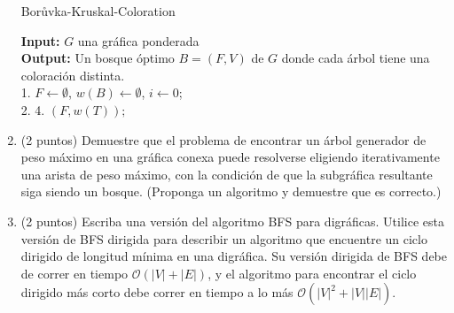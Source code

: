 \documentclass{article}
\begin{document}
\begin{enumerate}
  \begin{algorithm}[H]
    \SetAlgoNoLined
    \caption{Bor\r uvka-Kruskal-Coloration}
    \textbf{Input:} $G$ una gráfica ponderada\\
    \textbf{Output:} Un bosque óptimo $B = (F,V)$ de $G$ donde cada árbol tiene una coloración distinta.\\
    1. $F \leftarrow \emptyset$, $w(B) \leftarrow \emptyset$, $i \leftarrow 0$;\\
    2.  
    4. 
    \Return $(F,w(T));$
  \end{algorithm}
  
\item (2 puntos) Demuestre que el problema de encontrar un \'arbol generador
  de peso m\'aximo en una gr\'afica conexa puede resolverse eligiendo
  iterativamente una arista de peso m\'aximo, con la condici\'on de que la
  subgr\'afica resultante siga siendo un bosque. (Proponga un algoritmo y
  demuestre que es correcto.)

\item (2 puntos) Escriba una versi\'on del algoritmo BFS para digr\'aficas.
  Utilice esta versi\'on de BFS dirigida para describir un algoritmo que
  encuentre un ciclo dirigido de longitud m\'inima en una digr\'afica.    Su
  versi\'on dirigida de BFS debe de correr en tiempo $\mathcal{O} (|V| +
  |E|)$, y el algoritmo para encontrar el ciclo dirigido m\'as corto debe
  correr en tiempo a lo m\'as $\mathcal{O} (|V|^2 + |V| |E|)$.
\end{enumerate}
\end{document}
